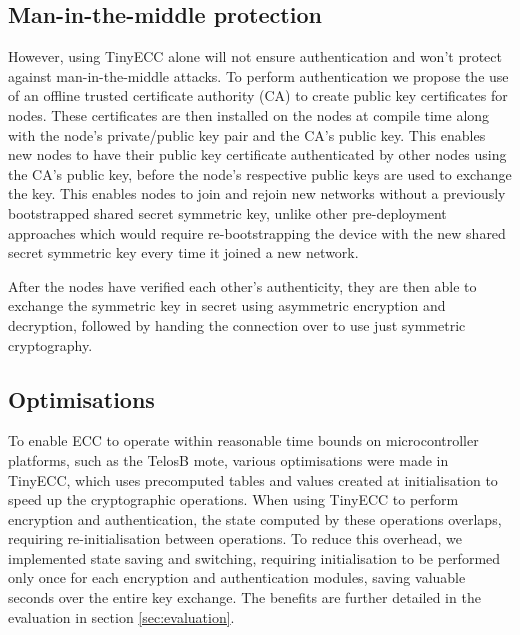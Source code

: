 \documentclass[conference]{./sty/IEEEtran}
\begin{document}
\subsection{Man-in-the-middle protection} %
\label{sub:man_in_the_middle_protection}
However, using TinyECC alone will not ensure authentication and won't protect against man-in-the-middle attacks. To perform authentication we propose the use of an offline trusted certificate authority (CA) to create public key certificates for nodes. These certificates are then installed on the nodes at compile time along with the node's private/public key pair and the CA's public key. This enables new nodes to have their public key certificate authenticated by other nodes using the CA's public key, before the node's respective public keys are used to exchange the key. This enables nodes to join and rejoin new networks without a previously bootstrapped shared secret symmetric key, unlike other pre-deployment approaches which would require re-bootstrapping the device with the new shared secret symmetric key every time it joined a new network.

After the nodes have verified each other's authenticity, they are then able to exchange the symmetric key in secret using asymmetric encryption and decryption, followed by handing the connection over to use just symmetric cryptography. 

\subsection{Optimisations} %
\label{sub:optimisations}
To enable ECC to operate within reasonable time bounds on microcontroller platforms, such as the TelosB mote, various optimisations were made in TinyECC, which uses precomputed tables and values created at initialisation to speed up the cryptographic operations. When using TinyECC to perform encryption and authentication, the state computed by these operations overlaps, requiring re-initialisation between operations. To reduce this overhead, we implemented state saving and switching, requiring initialisation to be performed only once for each encryption and authentication modules, saving valuable seconds over the entire key exchange. The benefits are further detailed in the evaluation in section \ref{sec:evaluation}.
\end{document}
